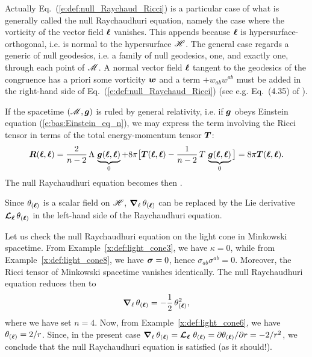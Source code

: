 {{\begin{remark}
Actually Eq.~(\ref{e:def:null_Raychaud_Ricci}) is a particular case of
what is generally called the null Raychaudhuri equation, namely the case where
the vorticity of the vector field $\bm{\ell}$ vanishes. This
appends because $\bm{\ell}$ is hypersurface-orthogonal, i.e. is normal to the
hypersurface $\mathscr{H}$. The general case regards a generic
 of null
geodesics, i.e. a family of null geodesics, one, and exactly one, through
each point of $\mathscr{M}$. A normal vector field $\bm{\ell}$ tangent to the geodesics
of the congruence has a priori some vorticity $\bm{w}$ and a term
$+w_{ab} w^{ab}$ must be added in the right-hand side of
Eq.~(\ref{e:def:null_Raychaud_Ricci}) (see e.g. Eq.~(4.35) of \cite{HawkiE73}).
\end{remark}

If the spacetime $(\mathscr{M},\bm{g})$ is ruled by general relativity, i.e. if
$\bm{g}$ obeys Einstein equation (\ref{e:bas:Einstein_eq_n}), we may express
the term involving the Ricci tensor in terms of the total energy-momentum tensor
$\bm{T}$:
\[
  \bm{R}(\bm{\ell}, \bm{\ell})  = \frac{2}{n-2}\,\Lambda\,  \underbrace{\bm{g}(\bm{\ell}, \bm{\ell})}_{0}
    + 8\pi \big[ \bm{T}(\bm{\ell}, \bm{\ell}) - \frac{1}{n-2}\,  T \, \underbrace{\bm{g}(\bm{\ell}, \bm{\ell})}_{0} \big]
    = 8\pi \bm{T}(\bm{\ell}, \bm{\ell}) .
\]
The null Raychaudhuri equation becomes then
\be \label{e:def:null_Raychaud}
    .
\ee

\begin{remark}
Since $\theta_{(\bm{\ell})}$ is a scalar field on $\mathscr{H}$, $\bm{\nabla}_{\ell}\,  \theta_{(\bm{\ell})}$
can be replaced by the Lie derivative $\bm{\mathcal{L}}_{\bm{\bm{\ell}}}\, \theta_{(\bm{\ell})}$ in the left-hand side of the Raychaudhuri
equation.
\end{remark}

\begin{example}
Let us check the null Raychaudhuri equation on the light cone in Minkowski
spacetime. From Example~\ref{x:def:light_cone3}, we have $\kappa=0$, while
from Example~\ref{x:def:light_cone8}, we have $\bm{\sigma}=0$,
hence $\sigma_{ab} \sigma^{ab}=0$. Moreover, the Ricci tensor of Minkowski
spacetime vanishes identically. The null Raychaudhuri equation reduces
then to
\[
    \bm{\nabla}_{\ell}\,  \theta_{(\bm{\ell})} =  - \frac{1}{2} \, \theta_{(\bm{\ell})}^2 ,
\]
where we have set $n=4$. Now, from Example~\ref{x:def:light_cone6}, we
have $\theta_{(\bm{\ell})} = 2/r$. Since, in the present case
$\bm{\nabla}_{\ell}\,  \theta_{(\bm{\ell})}  = \bm{\mathcal{L}}_{\bm{\ell}}\, \,  \theta_{(\bm{\ell})}  = {\partial \theta_{(\bm{\ell})}}/{\partial r} =
- 2/r^2$, we conclude that the null Raychaudhuri equation is satisfied (as
it should!).
\end{example}

}}
